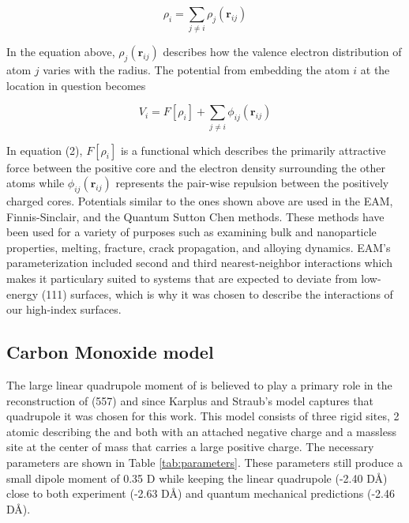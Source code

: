 \begin{equation}
\rho_{i} = \sum_{j \ne i}\rho_{j}(\mathbf{r}_{ij})
\end{equation}

In the equation above, $\rho_{j}(\mathbf{r}_{ij})$ describes how the valence
electron distribution of atom $j$ varies with the radius.  The potential from
embedding the atom $i$ at the location in question becomes

\begin{equation}
V_{i} = F[\rho_{i}] + \sum_{j \ne i} \phi_{ij}(\mathbf{r}_{ij})
\end{equation}

In equation (2), $F[\rho_{i}]$ is a functional which describes the primarily
attractive force between the positive core and the electron density surrounding
the other atoms while $\phi_{ij}(\mathbf{r}_{ij})$ represents the pair-wise
repulsion between the positively charged cores.  Potentials similar to the ones
shown above are used in the EAM, Finnis-Sinclair, and the Quantum Sutton Chen
methods.  These methods have been used for a variety of purposes such as
examining bulk and nanoparticle properties, \citep{Chui:2003fk, Wang:2005qy,
Medasani:2007uq, Mishin:1999ew} melting,\citep{Belonoshko:2000jk,
Sankaranarayanan:2006ye, Sankaranarayanan:2005bh} fracture,
\citep{Shastry:1996qg, Shastry:1998dx, Mishin:2001qt} crack propagation,
\citep{Becquart:1993sr} and alloying dynamics.  \citep{Shibata:2002hh,
Mishin:2002if, Zope:2003ai, Mishin:2005vc} EAM's parameterization included
second and third nearest-neighbor interactions which makes it particulary
suited to systems that are expected to deviate from low-energy (111) surfaces,
which is why it was chosen to describe the  interactions of
our high-index surfaces.  \citep{Foiles:1986ky} 

\subsection{Carbon Monoxide model}
The large linear quadrupole moment of  is believed to play a primary
role in the reconstruction of  (557)\citep{Tao:2010aa, Michalka:2013aa}
and since Karplus and Straub's model captures that quadrupole it was chosen for
this work.\citep{Straub:1991no} This model consists of three rigid sites, 2
atomic describing the  and  both with an attached negative charge
and a massless site at the center of mass that carries a large positive charge.
The necessary parameters are shown in Table \ref{tab:parameters}.  These
parameters still produce a small dipole moment of 0.35 D while keeping the
linear quadrupole (-2.40 D\AA) close to both experiment (-2.63 D\AA)
\citep{Chetty:2011dp} and quantum mechanical predictions (-2.46 D\AA).
\citep{Rizzo:2000sp}

